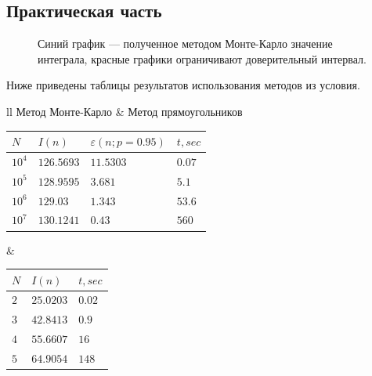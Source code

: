 \documentclass[12pt, a4paper]{article}
\begin{document}
\subsection{Практическая часть}
\begin{figure}[H]
\begin{center}
\end{center}
\caption{Синий график --- полученное методом Монте-Карло значение интеграла, красные графики ограничивают доверительный интервал.}
\end{figure}

Ниже приведены таблицы результатов использования методов из условия.

\begin{tabular}{ll}
Метод Монте-Карло & Метод прямоугольников \\
\begin{tabular}{|l|l|l|l|}
\hline
$N$  &  $I(n)$ & $\varepsilon(n;p=0.95)$ & $t, sec$ \\ 
\hline
$10^4$ & $126.5693$ & $11.5303$ & $0.07$\\
\hline
$10^5$ & $128.9595$ & $3.681$ & $5.1$\\
\hline
$10^6$ & $129.03$   & $1.343$ & $53.6$ \\
\hline
$10^7$ & $130.1241$ & $0.43$ & $560$\\
\hline
\end{tabular} & \begin{tabular}{|l|l|l|}
\hline
$N$  &  $I(n)$ & $t, sec$ \\ 
\hline
$2$ & $25.0203$ & $0.02$\\ 
\hline
$3$ & $42.8413$ & $0.9$\\
\hline
$4$ & $55.6607$ & $16$ \\
\hline
$5$ & $64.9054$ & $148$\\
\hline
\end{tabular} 
\end{tabular}
\newpage
\end{document}
